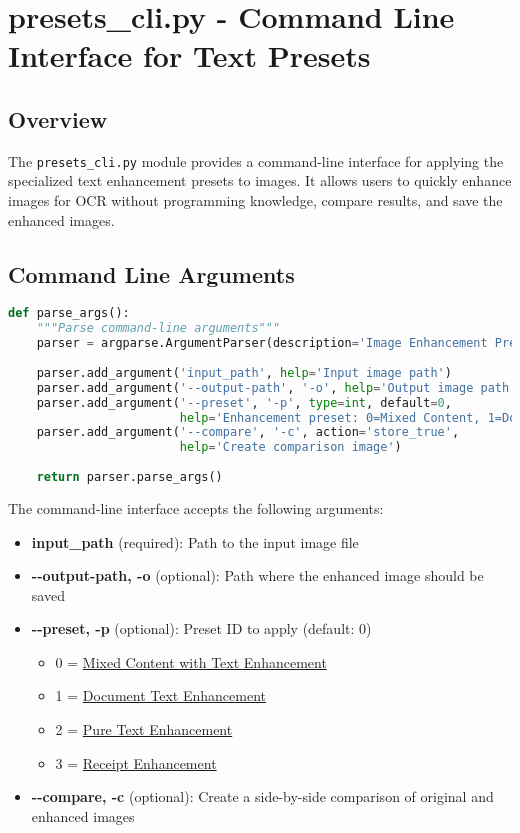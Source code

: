 \section{presets\_cli.py - Command Line Interface for Text Presets}

\subsection{Overview}
The \texttt{presets\_cli.py} module provides a command-line interface for applying the specialized text enhancement presets to images. It allows users to quickly enhance images for OCR without programming knowledge, compare results, and save the enhanced images.

\subsection{Command Line Arguments}

\begin{lstlisting}[language=Python, caption=Command Line Argument Parser]
def parse_args():
    """Parse command-line arguments"""
    parser = argparse.ArgumentParser(description='Image Enhancement Presets for OCR Text')
    
    parser.add_argument('input_path', help='Input image path')
    parser.add_argument('--output-path', '-o', help='Output image path')
    parser.add_argument('--preset', '-p', type=int, default=0, 
                        help='Enhancement preset: 0=Mixed Content, 1=Document, 2=Text Only, 3=Receipt')
    parser.add_argument('--compare', '-c', action='store_true', 
                        help='Create comparison image')
    
    return parser.parse_args()
\end{lstlisting}

The command-line interface accepts the following arguments:

\begin{itemize}
    \item \textbf{input\_path} (required): Path to the input image file
    \item \textbf{-{}-output-path, -o} (optional): Path where the enhanced image should be saved
    \item \textbf{-{}-preset, -p} (optional): Preset ID to apply (default: 0)
        \begin{itemize}
            \item 0 = \hyperref[sec:mixed_content_preset]{Mixed Content with Text Enhancement}
            \item 1 = \hyperref[sec:text_document_preset]{Document Text Enhancement}
            \item 2 = \hyperref[sec:text_only_preset]{Pure Text Enhancement}
            \item 3 = \hyperref[sec:receipt_preset]{Receipt Enhancement}
        \end{itemize}
    \item \textbf{-{}-compare, -c} (optional): Create a side-by-side comparison of original and enhanced images
\end{itemize}

